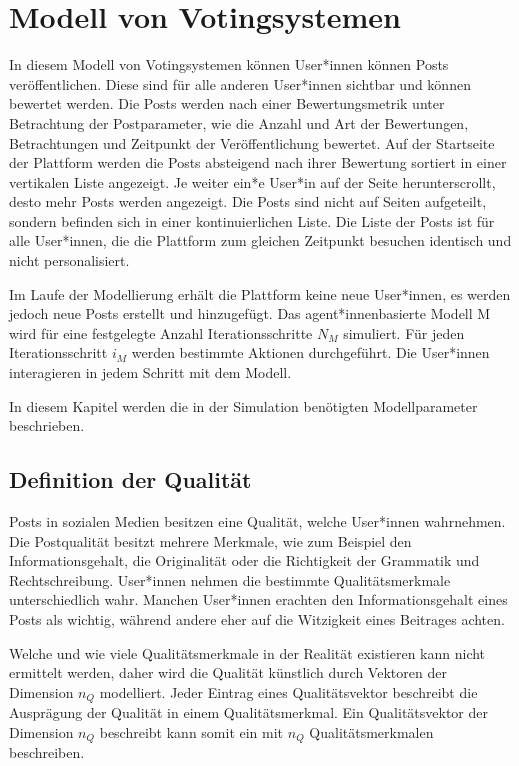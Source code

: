 \chapter{Modell von Votingsystemen}
\label{chapter:modell}

In diesem Modell von Votingsystemen können User*innen können Posts veröffentlichen. Diese sind für alle anderen User*innen sichtbar und können bewertet werden. Die Posts werden nach einer Bewertungsmetrik unter Betrachtung der Postparameter, wie die Anzahl und Art der Bewertungen, Betrachtungen und Zeitpunkt der Veröffentlichung bewertet. Auf der Startseite der Plattform werden die Posts absteigend nach ihrer Bewertung sortiert in einer vertikalen Liste angezeigt. Je weiter ein*e User*in auf der Seite herunterscrollt, desto mehr Posts werden angezeigt. Die Posts sind nicht auf Seiten aufgeteilt, sondern befinden sich in einer kontinuierlichen Liste. Die Liste der Posts ist für alle User*innen, die die Plattform zum gleichen Zeitpunkt besuchen identisch und nicht personalisiert.

Im Laufe der Modellierung erhält die Plattform keine neue User*innen, es werden jedoch neue Posts erstellt und hinzugefügt.
Das agent*innenbasierte Modell \ac{M} wird für eine festgelegte Anzahl Iterationsschritte $N_M$ simuliert. Für jeden Iterationsschritt $i_M$ werden bestimmte Aktionen durchgeführt. Die User*innen interagieren in jedem Schritt mit dem Modell.

In diesem Kapitel werden die in der Simulation benötigten Modellparameter beschrieben.

\section{Definition der Qualität}

Posts in sozialen Medien besitzen eine Qualität, welche User*innen wahrnehmen. Die Postqualität besitzt mehrere Merkmale, wie zum Beispiel den Informationsgehalt, die Originalität oder die Richtigkeit der Grammatik und Rechtschreibung. User*innen nehmen die bestimmte Qualitätsmerkmale unterschiedlich wahr. Manchen User*innen erachten den Informationsgehalt eines Posts als wichtig, während andere eher auf die Witzigkeit eines Beitrages achten.

Welche und wie viele Qualitätsmerkmale in der Realität existieren kann nicht ermittelt werden, daher wird die Qualität künstlich durch Vektoren der Dimension $n_Q$ modelliert. Jeder Eintrag eines Qualitätsvektor beschreibt die Ausprägung der Qualität in einem Qualitätsmerkmal. Ein Qualitätsvektor der Dimension $n_Q$ beschreibt kann somit ein mit $n_Q$ Qualitätsmerkmalen beschreiben. 

